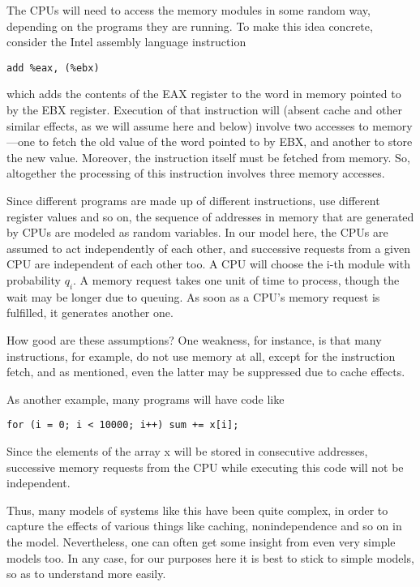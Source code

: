 \documentclass[11pt]{article}
\begin{document}
The CPUs will need to access the memory modules in some random way,
depending on the programs they are running.  To make this idea concrete,
consider the Intel assembly language instruction

\begin{verbatim}
add %eax, (%ebx)
\end{verbatim}

which adds the contents of the EAX register to the word in memory
pointed to by the EBX register.  Execution of that instruction will
(absent cache and other similar effects, as we will assume here and
below) involve two accesses to memory---one to fetch the old value of
the word pointed to by EBX, and another to store the new value.
Moreover, the instruction itself must be fetched from memory.  So,
altogether the processing of this instruction involves three memory
accesses.

Since different programs are made up of different instructions, use
different register values and so on, the sequence of addresses in memory
that are generated by CPUs are modeled as random variables.  In our
model here, the CPUs are assumed to act independently of each other, and
successive requests from a given CPU are independent of each other too.
A CPU will choose the i-th module with probability $q_{i}$. A memory
request takes one unit of time to process, though the wait may be longer
due to queuing.  As soon as a CPU's memory request is fulfilled, it
generates another one.

How good are these assumptions?  One weakness, for instance, is that
many instructions, for example, do not use memory at all, except for the
instruction fetch, and as mentioned, even the latter may be suppressed
due to cache effects.  

As another example, many programs will have code like

\begin{verbatim}
for (i = 0; i < 10000; i++) sum += x[i];
\end{verbatim}

Since the elements of the array x will be stored in consecutive
addresses, successive memory requests from the CPU while executing this
code will not be independent.

Thus, many models of systems like this have been quite complex, in order
to capture the effects of various things like caching, nonindependence
and so on in the model.  Nevertheless, one can often get some insight
from even very simple models too.  In any case, for our purposes here it
is best to stick to simple models, so as to understand more easily.
\end{document}
